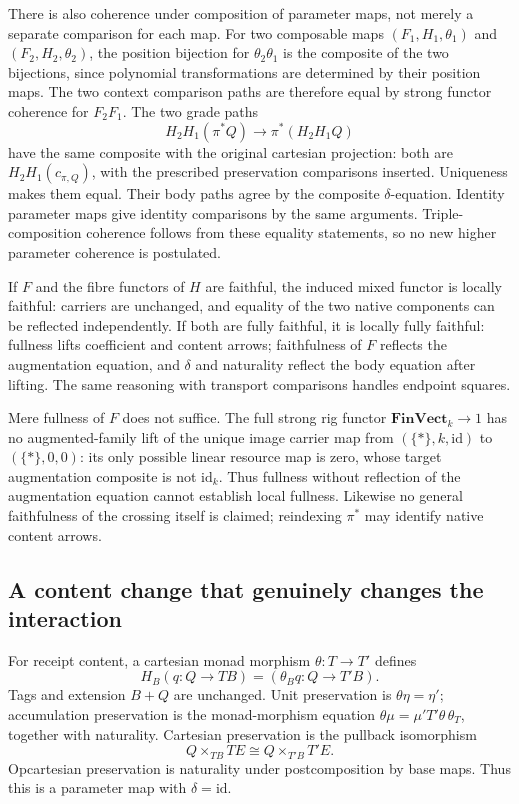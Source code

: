 \documentclass[11pt,a4paper]{article}
\theoremstyle{definition}
\newcommand{\id}{\mathrm{id}}
\newcommand{\FinVect}{\mathbf{FinVect}}
\begin{document}
There is also coherence under composition of parameter maps, not merely a
separate comparison for each map. For two composable maps $(F_1,H_1,\theta_1)$
and $(F_2,H_2,\theta_2)$, the position bijection for
$\theta_2\theta_1$ is the composite of the two bijections, since polynomial
transformations are determined by their position maps. The two context
comparison paths are therefore equal by strong functor coherence for
$F_2F_1$. The two grade paths
\[
 H_2H_1(\pi^*Q)\longrightarrow\pi^*(H_2H_1Q)
\]
have the same composite with the original cartesian projection: both are
$H_2H_1(c_{\pi,Q})$, with the prescribed preservation comparisons inserted.
Uniqueness makes them equal. Their body paths agree by the composite
$\delta$-equation. Identity parameter maps give identity comparisons by the
same arguments. Triple-composition coherence follows from these equality
statements, so no new higher parameter coherence is postulated.

If $F$ and the fibre functors of $H$ are faithful, the induced mixed functor
is locally faithful: carriers are unchanged, and equality of the two native
components can be reflected independently. If both are fully faithful, it is
locally fully faithful: fullness lifts coefficient and content arrows;
faithfulness of $F$ reflects the augmentation equation, and $\delta$ and
naturality reflect the body equation after lifting. The same reasoning with
transport comparisons handles endpoint squares.

Mere fullness of $F$ does not suffice. The full strong rig functor
$\FinVect_k\to1$ has no augmented-family lift of the unique image carrier map
from $(\{*\},k,\id)$ to $(\{*\},0,0)$: its only possible linear resource map
is zero, whose target augmentation composite is not $\id_k$. Thus fullness
without reflection of the augmentation equation cannot establish local
fullness. Likewise no general faithfulness of the crossing itself is claimed;
reindexing $\pi^*$ may identify native content arrows.

\subsection{A content change that genuinely changes the interaction}
For receipt content, a cartesian monad morphism $\theta:T\to T'$ defines
\[
 H_B(q:Q\to TB)=(\theta_Bq:Q\to T'B).
\]
Tags and extension $B+Q$ are unchanged. Unit preservation is
$\theta\eta=\eta'$; accumulation preservation is the monad-morphism equation
$\theta\mu=\mu' T'\theta\,\theta_T$, together with naturality. Cartesian
preservation is the pullback isomorphism
\[
 Q\times_{TB}TE\cong Q\times_{T'B}T'E.
\]
Opcartesian preservation is naturality under postcomposition by base maps.
Thus this is a parameter map with $\delta=\id$.
\end{document}
